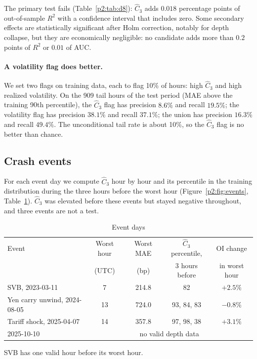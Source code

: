 The primary test fails (Table~\ref{p2:tab:d8}): $\hat C_3$ adds $0.018$ percentage points of out-of-sample $R^2$ with a confidence interval that includes zero. Some secondary effects are statistically significant after Holm correction, notably for depth collapse, but they are economically negligible: no candidate adds more than $0.2$ points of $R^2$ or $0.01$ of AUC.

\paragraph{A volatility flag does better.} We set two flags on training data, each to flag 10\% of hours: high $\hat C_3$ and high realized volatility. On the 909 tail hours of the test period (MAE above the training 90th percentile), the $\hat C_3$ flag has precision $8.6\%$ and recall $19.5\%$; the volatility flag has precision $38.1\%$ and recall $37.1\%$; the union has precision $16.3\%$ and recall $49.4\%$. The unconditional tail rate is about 10\%, so the $\hat C_3$ flag is no better than chance.

\subsection{Crash events}
For each event day we compute $\hat C_3$ hour by hour and its percentile in the training distribution during the three hours before the worst hour (Figure~\ref{p2:fig:events}, Table~\ref{p2:tab:d9}). $\hat C_3$ was elevated before these events but stayed negative throughout, and three events are not a test.

\begin{table}[t]\centering\small
\begin{threeparttable}
\caption{Event days}\label{p2:tab:d9}
\begin{tabular}{lcccc}
\toprule
Event & Worst hour & Worst MAE & $\hat C_3$ percentile, & OI change\\
 & (UTC) & (bp) & 3 hours before & in worst hour\\
\midrule
SVB, 2023-03-11 & 7 & 214.8 & 82 & $+2.5\%$\\
Yen carry unwind, 2024-08-05 & 13 & 724.0 & 93, 84, 83 & $-0.8\%$\\
Tariff shock, 2025-04-07 & 14 & 357.8 & 97, 98, 38 & $+3.1\%$\\
2025-10-10 & \multicolumn{4}{c}{no valid depth data}\\
\bottomrule
\end{tabular}
\begin{tablenotes}\footnotesize\item SVB has one valid hour before its worst hour. \end{tablenotes}
\end{threeparttable}
\end{table}

